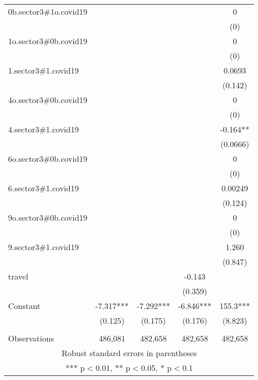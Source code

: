 \documentclass[]{article}
\begin{document}
\begin{tabular}{lcccc}
0b.sector3\#1o.covid19 &  &  &  & 0 \\
 &  &  &  & (0) \\
1o.sector3\#0b.covid19 &  &  &  & 0 \\
 &  &  &  & (0) \\
1.sector3\#1.covid19 &  &  &  & 0.0693 \\
 &  &  &  & (0.142) \\
4o.sector3\#0b.covid19 &  &  &  & 0 \\
 &  &  &  & (0) \\
4.sector3\#1.covid19 &  &  &  & -0.164** \\
 &  &  &  & (0.0666) \\
6o.sector3\#0b.covid19 &  &  &  & 0 \\
 &  &  &  & (0) \\
6.sector3\#1.covid19 &  &  &  & 0.00249 \\
 &  &  &  & (0.124) \\
9o.sector3\#0b.covid19 &  &  &  & 0 \\
 &  &  &  & (0) \\
9.sector3\#1.covid19 &  &  &  & 1.260 \\
 &  &  &  & (0.847) \\
travel &  &  & -0.143 &  \\
 &  &  & (0.359) &  \\
Constant & -7.317*** & -7.292*** & -6.846*** & 155.3*** \\
 & (0.125) & (0.175) & (0.176) & (8.823) \\
 &  &  &  &  \\
 Observations & 486,081 & 482,658 & 482,658 & 482,658 \\ \hline
\multicolumn{5}{c}{ Robust standard errors in parentheses} \\
\multicolumn{5}{c}{ *** p$<$0.01, ** p$<$0.05, * p$<$0.1} \\
\end{tabular}
\end{document}
